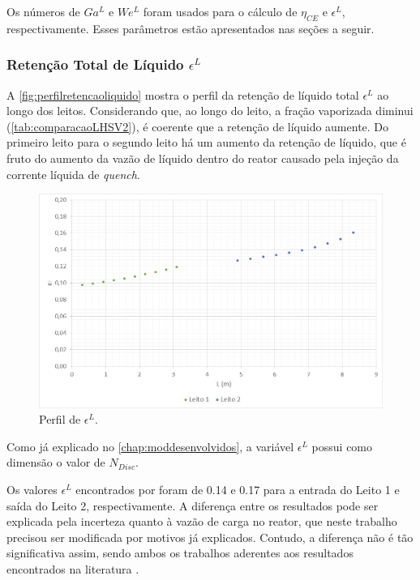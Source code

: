 Os números de $Ga^L$ e $We^L$ foram usados para o cálculo de $\eta_{CE}$ e
$\epsilon^{L}$, respectivamente. Esses parâmetros estão apresentados nas seções
a seguir.

\subsubsection{Retenção Total de Líquido $\epsilon^{L}$}
\label{retencaototaldeliquido}

A \autoref{fig:perfilretencaoliquido} mostra o perfil da retenção de líquido
total $\epsilon^{L}$ ao longo dos leitos. Considerando que, ao longo do leito, a
fração vaporizada diminui (\autoref{tab:comparacaoLHSV2}), é coerente que a
retenção de líquido aumente. Do primeiro leito para o segundo leito há um
aumento da retenção de líquido, que é fruto do aumento da vazão de líquido
dentro do reator causado pela injeção da corrente líquida de \emph{quench}.

\begin{figure}[htb]
\centering
\includegraphics[scale=0.4]{images/Chap4/perfilretencaoliquido.png}
\caption{Perfil de $\epsilon^{L}$.}
\label{fig:perfilretencaoliquido}
\end{figure}

Como já explicado no \autoref{chap:moddesenvolvidos}, a variável $\epsilon^{L}$
possui como dimensão o valor de $N_{Disc}$.

Os valores $\epsilon^{L}$ encontrados por  foram de
\num{0,14} e \num{0,17} para a entrada do Leito 1 e saída do Leito 2,
respectivamente. A diferença entre os resultados pode ser explicada pela
incerteza quanto à vazão de carga no reator, que neste trabalho precisou ser
modificada por motivos já explicados. Contudo, a diferença não é tão
significativa assim, sendo ambos os trabalhos aderentes aos resultados
encontrados na literatura \cite{Ancheyta2011}.

